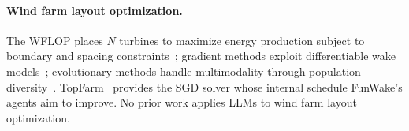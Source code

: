 \paragraph{Wind farm layout optimization.}
The WFLOP places $N$ turbines to maximize energy production subject
to boundary and spacing
constraints~\cite{mosetti1994optimization,grady2005placement};
gradient methods exploit differentiable wake
models~\cite{thomas2023improving,quick2024design,stanley2019massive};
evolutionary methods handle multimodality through population
diversity~\cite{chen2013wind,rios2023population}.
TopFarm~\cite{pedersen2019topfarm} provides the SGD solver whose
internal schedule FunWake's agents aim to improve. No prior work
applies LLMs to wind farm layout optimization.
